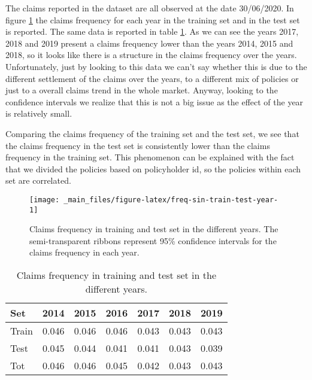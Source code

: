 \documentclass[a4paper, twoside, openright, 12pt]{report}
\theoremstyle{definition}
\theoremstyle{definition}
\theoremstyle{definition}
\theoremstyle{remark}
\begin{document}
The claims reported in the dataset are all observed at the date 30/06/2020. In figure \ref{fig:freq-sin-train-test-year} the claims frequency for each year in the training set and in the test set is reported. The same data is reported in table \ref{tab:freq-sin-train-test-year}. As we can see the years 2017, 2018 and 2019 present a claims frequency lower than the years 2014, 2015 and 2018, so it looks like there is a structure in the claims frequency over the years. Unfortunately, just by looking to this data we can't say whether this is due to the different settlement of the claims over the years, to a different mix of policies or just to a overall claims trend in the whole market. Anyway, looking to the confidence intervals we realize that this is not a big issue as the effect of the year is relatively small.

Comparing the claims frequency of the training set and the test set, we see that the claims frequency in the test set is consistently lower than the claims frequency in the training set. This phenomenon can be explained with the fact that we divided the policies based on policyholder id, so the policies within each set are correlated.





\begin{figure}[!hbtp]

{\centering \texttt{[image: \_main\_files/figure-latex/freq-sin-train-test-year-1]} 

}

\caption[Claims frequency in training and test set in the different years.]{Claims frequency in training and test set in the different years. The semi-transparent ribbons represent 95\% confidence intervals for the claims frequency in each year.}\label{fig:freq-sin-train-test-year}
\end{figure}

\begin{table}[!h]

\caption{\label{tab:freq-sin-train-test-year}Claims frequency in training and test set in the different years.}
\centering
\begin{tabular}[t]{lcccccc}
\toprule
\textbf{Set} & \textbf{2014} & \textbf{2015} & \textbf{2016} & \textbf{2017} & \textbf{2018} & \textbf{2019}\\
\midrule[\heavyrulewidth]
Train & 0.046 & 0.046 & 0.046 & 0.043 & 0.043 & 0.043\\
Test & 0.045 & 0.044 & 0.041 & 0.041 & 0.043 & 0.039\\
\midrule
Tot & 0.046 & 0.046 & 0.045 & 0.042 & 0.043 & 0.043\\
\bottomrule
\end{tabular}
\end{table}
\end{document}
